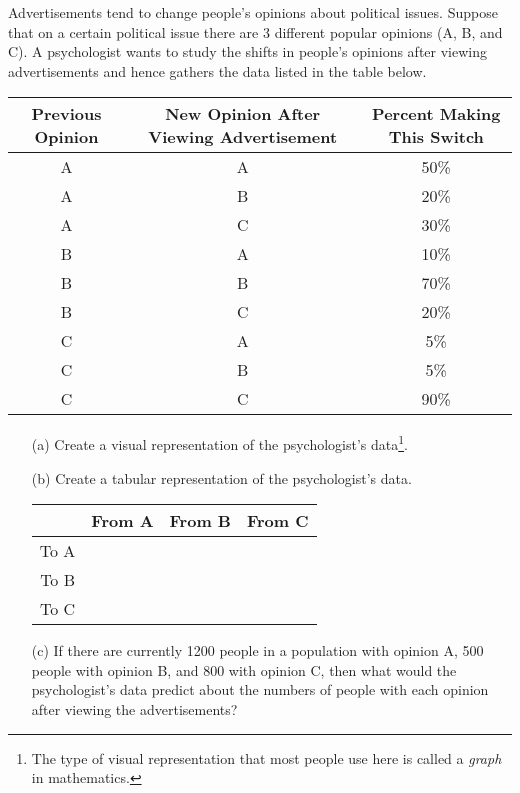 % 
\begin{problem}
    Advertisements tend to change people's opinions about political issues. Suppose that
    on a certain political issue there are 3 different popular opinions (A, B, and C).  A
    psychologist wants to study the shifts in people's opinions after viewing
    advertisements and hence gathers the data listed in the table below.
    \begin{center}
        \begin{tabular}{|c|c|c|}
            \hline
            Previous Opinion & New Opinion After Viewing Advertisement & Percent Making
            This Switch \\ \hline \hline
            A &A &50\%\\
            A &B &20\%\\
            A &C &30\%\\\hline
            B &A &10\%\\
            B &B &70\%\\
            B &C &20\%\\\hline
            C &A &5\%\\
            C &B &5\%\\
            C &C &90\%\\\hline
        \end{tabular}
    \end{center}

    \begin{enumerate}
        \item[(a)] Create a visual representation of the psychologist's data\footnote{The type
                of visual representation that most people use here is called a {\it graph}
            in mathematics.}.
        \item[(b)] Create a tabular representation of the psychologist's data.
            \begin{center}
                \begin{tabular}{c|ccc}
                    & From A & From B & From C \\ \hline
                    To A &  &  &  \\
                    To B &  &  &  \\
                    To C &  &  &  \\
                \end{tabular}
            \end{center}
        \item[(c)] If there are currently 1200 people in a population with opinion A, 500
            people with opinion B, and 800 with opinion C, then what would the
            psychologist's data predict about the numbers of people with each opinion
            after viewing the advertisements?


\end{enumerate}
\end{problem}
